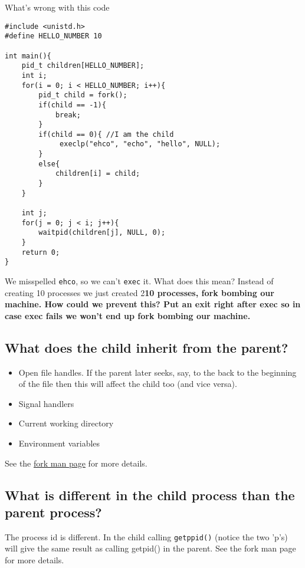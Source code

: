 What's wrong with this code

\begin{verbatim}
#include <unistd.h>
#define HELLO_NUMBER 10

int main(){
    pid_t children[HELLO_NUMBER];
    int i;
    for(i = 0; i < HELLO_NUMBER; i++){
        pid_t child = fork();
        if(child == -1){
            break;
        }
        if(child == 0){ //I am the child
             execlp("ehco", "echo", "hello", NULL);
        }
        else{
            children[i] = child;
        }
    }

    int j;
    for(j = 0; j < i; j++){
        waitpid(children[j], NULL, 0);
    }
    return 0;
}
\end{verbatim}

We misspelled \texttt{ehco}, so we can't \texttt{exec} it. What does
this mean? Instead of creating 10 processes we just created 2\textbf{10
processes, fork bombing our machine. How could we prevent this? Put an
exit right after exec so in case exec fails we won't end up fork bombing
our machine.}

\subsection{What does the child inherit from the
parent?}\label{what-does-the-child-inherit-from-the-parent}

\begin{itemize}
\tightlist
\item
  Open file handles. If the parent later seeks, say, to the back to the
  beginning of the file then this will affect the child too (and vice
  versa).
\item
  Signal handlers
\item
  Current working directory
\item
  Environment variables
\end{itemize}

See the \href{http://linux.die.net/man/2/fork}{fork man page} for more
details.

\subsection{What is different in the child process than the parent
process?}\label{what-is-different-in-the-child-process-than-the-parent-process-1}

The process id is different. In the child calling \texttt{getppid()}
(notice the two 'p's) will give the same result as calling getpid() in
the parent. See the fork man page for more details.

